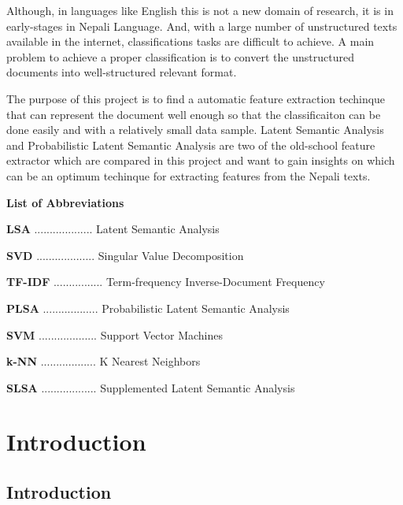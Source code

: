 \documentclass[12pt]{report}
\begin{document}
        Although, in languages like English this is not a new domain of research, it is in early-stages in Nepali Language. And, with a large 
        number of unstructured texts available in the internet, classifications tasks are difficult to achieve. A main problem to achieve a proper 
        classification is to convert the unstructured documents into well-structured relevant format. 

        The purpose of this project is to find a automatic feature extraction techinque that can represent the document well enough so that the classificaiton can be
        done easily and with a relatively small data sample. Latent Semantic Analysis and Probabilistic Latent Semantic Analysis are two of the old-school 
        feature extractor which are compared in this project and want to gain insights on which can be an optimum techinque for extracting features from the Nepali texts.
        
        


    \newpage


    \begin{center}
        \textbf{
            List of Abbreviations
        }

       



    \end{center}
    \textbf{LSA} ................... Latent Semantic Analysis


    \textbf{SVD} ................... Singular Value Decomposition

    \textbf{TF-IDF} ................ Term-frequency Inverse-Document Frequency
    
    
    \textbf{PLSA} .................. Probabilistic Latent Semantic Analysis


    \textbf{SVM} ................... Support Vector Machines


    \textbf{k-NN} .................. K Nearest Neighbors


    \textbf{SLSA} .................. Supplemented Latent Semantic Analysis
    

    \newpage

    \tableofcontents
    \newpage
    \chapter{Introduction}
    
    \section{Introduction}
\end{document}
